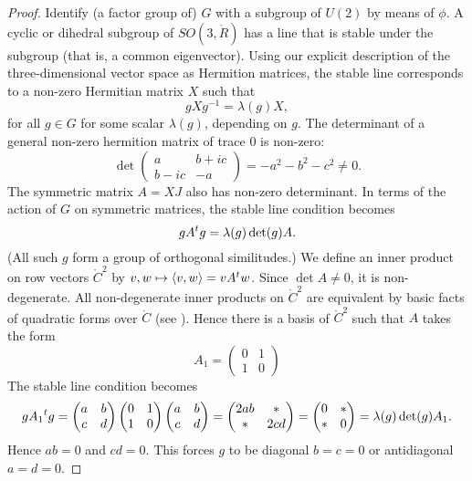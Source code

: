 \documentclass{amsart}
\def\t#1{\hbox{}^t#1}
\begin{document}
\begin{proof} Identify (a factor group of) $G$ with a subgroup of
  $U(2)$ by means of $\phi$.  A cyclic or dihedral subgroup of
  $SO(3,\ring{R})$ has a line that is stable under the subgroup (that
  is, a common eigenvector). Using our explicit description of the
  three-dimensional vector space as Hermition matrices, the stable
  line corresponds to a non-zero Hermitian matrix $X$ such that
\[
g X g^{-1} = \lambda(g) X,
\]
for all $g\in G$ for some scalar $\lambda(g)$, depending on $g$.
The determinant of a general non-zero hermition matrix of trace $0$ is non-zero:
\[
\det\begin{pmatrix} a & b + i c\\ b - i c & -a\end{pmatrix} = -a^2 - b^2 - c^2 \ne 0.
\]
The symmetric matrix $A = X J$ also has non-zero determinant.  In
terms of the action of $G$ on symmetric matrices, the stable line
condition becomes
\[
g A \t{g} = \lambda(g)\det(g) A.
\]
(All such $g$ form a group of orthogonal similitudes.)  We define an
inner product on row vectors $\ring{C}^2$ by $v,w\mapsto \langle
v,w\rangle = v A \t{w}$.  Since $\det A\ne 0$, it is non-degenerate.
All non-degenerate inner products on $\ring{C}^2$ are equivalent by
basic facts of quadratic forms over $\ring{C}$ (see \cite{knapp-basic}).  Hence there is a
basis of $\ring{C}^2$ such that $A$ takes the form
\[
A_1 = \begin{pmatrix} 0 & 1 \\ 1 & 0\end{pmatrix}
\]
The stable line condition becomes
\begin{equation}
g A_1 \t{g}=\begin{pmatrix} a & b \\ c & d\end{pmatrix} 
\begin{pmatrix} 0 & 1 \\ 1 & 0\end{pmatrix}
\begin{pmatrix} a & b \\ c & d\end{pmatrix} = 
\begin{pmatrix} 2 a b & * \\ * & 2 c d\end{pmatrix} =
\begin{pmatrix} 0 & * \\ * & 0\end{pmatrix} = \lambda(g)\det(g) A_1.
\end{equation}
Hence $ab=0$ and $cd=0$.  This forces $g$ to be diagonal $b=c=0$ or
antidiagonal $a=d=0$.  


\end{proof}
\end{document}
